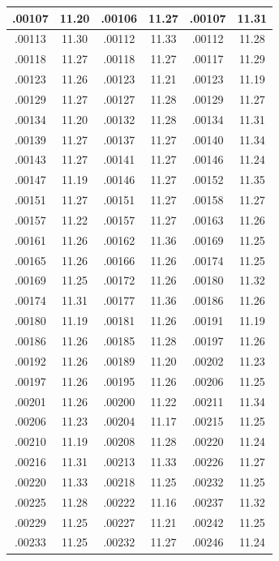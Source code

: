 \documentclass[10pt,twoside]{report}
\begin{document}
\begin{appendices}
\begin{longtable}{|c|c||c|c||c|c|}
.00107 & 11.20 & .00106 & 11.27 & .00107 & 11.31\\\hline
.00113 & 11.30 & .00112 & 11.33 & .00112 & 11.28\\\hline
.00118 & 11.27 & .00118 & 11.27 & .00117 & 11.29\\\hline
.00123 & 11.26 & .00123 & 11.21 & .00123 & 11.19\\\hline
.00129 & 11.27 & .00127 & 11.28 & .00129 & 11.27\\\hline
.00134 & 11.20 & .00132 & 11.28 & .00134 & 11.31\\\hline
.00139 & 11.27 & .00137 & 11.27 & .00140 & 11.34\\\hline
.00143 & 11.27 & .00141 & 11.27 & .00146 & 11.24\\\hline
.00147 & 11.19 & .00146 & 11.27 & .00152 & 11.35\\\hline
.00151 & 11.27 & .00151 & 11.27 & .00158 & 11.27\\\hline
.00157 & 11.22 & .00157 & 11.27 & .00163 & 11.26\\\hline
.00161 & 11.26 & .00162 & 11.36 & .00169 & 11.25\\\hline
.00165 & 11.26 & .00166 & 11.26 & .00174 & 11.25\\\hline
.00169 & 11.25 & .00172 & 11.26 & .00180 & 11.32\\\hline
.00174 & 11.31 & .00177 & 11.36 & .00186 & 11.26\\\hline
.00180 & 11.19 & .00181 & 11.26 & .00191 & 11.19\\\hline
.00186 & 11.26 & .00185 & 11.28 & .00197 & 11.26\\\hline
.00192 & 11.26 & .00189 & 11.20 & .00202 & 11.23\\\hline
.00197 & 11.26 & .00195 & 11.26 & .00206 & 11.25\\\hline
.00201 & 11.26 & .00200 & 11.22 & .00211 & 11.34\\\hline
.00206 & 11.23 & .00204 & 11.17 & .00215 & 11.25\\\hline
.00210 & 11.19 & .00208 & 11.28 & .00220 & 11.24\\\hline
.00216 & 11.31 & .00213 & 11.33 & .00226 & 11.27\\\hline
.00220 & 11.33 & .00218 & 11.25 & .00232 & 11.25\\\hline
.00225 & 11.28 & .00222 & 11.16 & .00237 & 11.32\\\hline
.00229 & 11.25 & .00227 & 11.21 & .00242 & 11.25\\\hline
.00233 & 11.25 & .00232 & 11.27 & .00246 & 11.24\\\hline

\end{longtable}
\end{appendices}
\end{document}
